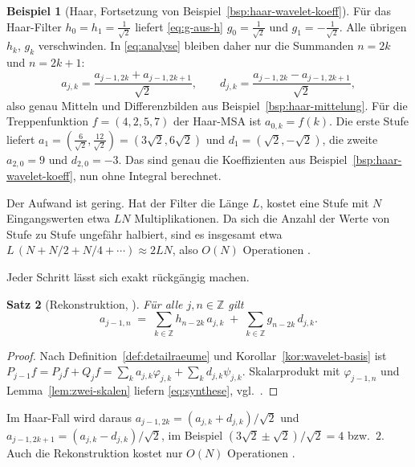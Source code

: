 \documentclass[a4paper,11pt,bibliography=totoc,listof=totoc,headinclude=true,cleardoublepage=empty,oneside]{scrbook}
\theoremstyle{plain}
\newtheorem{Satz}{Satz}[chapter]
\theoremstyle{definition}
\newtheorem{Beispiel}[Satz]{Beispiel}
\newcommand{\Z}{\mathbb{Z}}
\begin{document}
\begin{Beispiel}[Haar, Fortsetzung von Beispiel~\ref{bsp:haar-wavelet-koeff}]
\label{bsp:mallat-haar}
Für das Haar-Filter $h_0=h_1=\tfrac{1}{\sqrt2}$ liefert \eqref{eq:g-aus-h}
$g_0=\tfrac{1}{\sqrt2}$ und $g_1=-\tfrac{1}{\sqrt2}$. Alle übrigen $h_k$, $g_k$
verschwinden. In \eqref{eq:analyse} bleiben daher nur die Summanden
$n=2k$ und $n=2k+1$:
\[
  a_{j,k} = \frac{a_{j-1,2k} + a_{j-1,2k+1}}{\sqrt2},
  \qquad
  d_{j,k} = \frac{a_{j-1,2k} - a_{j-1,2k+1}}{\sqrt2},
\]
also genau Mitteln und Differenzbilden aus Beispiel~\ref{bsp:haar-mittelung}.
Für die Treppenfunktion $f=(4,2,5,7)$ der Haar-MSA ist $a_{0,k} = f(k)$. Die
erste Stufe liefert
$a_1 = (\tfrac{6}{\sqrt2},\tfrac{12}{\sqrt2}) = (3\sqrt2,6\sqrt2)$ und
$d_1 = (\sqrt2,-\sqrt2)$, die zweite $a_{2,0} = 9$ und $d_{2,0} = -3$. Das sind
genau die Koeffizienten aus Beispiel~\ref{bsp:haar-wavelet-koeff}, nun ohne
Integral berechnet.
\end{Beispiel}

Der Aufwand ist gering. Hat der Filter die Länge $L$, kostet eine Stufe mit $N$
Eingangswerten etwa $LN$ Multiplikationen. Da sich die Anzahl der Werte von
Stufe zu Stufe ungefähr halbiert, sind es insgesamt etwa
$L\,(N + N/2 + N/4 + \cdots) \approx 2LN$, also $O(N)$ Operationen
\cite[Kap.~5.4]{blatter}. %

Jeder Schritt lässt sich exakt rückgängig machen.

\begin{Satz}[Rekonstruktion, {\cite[Kap.~5.4]{blatter}}] %
\label{satz:rekonstruktion}
Für alle $j,n\in\Z$ gilt
\begin{equation}
\label{eq:synthese}
  a_{j-1,n} \;=\; \sum_{k\in\Z} h_{n-2k}\,a_{j,k} \;+\; \sum_{k\in\Z} g_{n-2k}\,d_{j,k} .
\end{equation}
\end{Satz}

\begin{proof}
Nach Definition~\ref{def:detailraeume} und Korollar~\ref{kor:wavelet-basis} ist
$P_{j-1}f = P_jf + Q_jf = \sum_k a_{j,k}\varphi_{j,k} + \sum_k d_{j,k}\psi_{j,k}$.
Skalarprodukt mit $\varphi_{j-1,n}$ und Lemma~\ref{lem:zwei-skalen} liefern
\eqref{eq:synthese}, vgl.\ \cite[Kap.~5.4]{blatter}. %
\end{proof}

Im Haar-Fall wird daraus
$a_{j-1,2k} = (a_{j,k}+d_{j,k})/\sqrt2$ und
$a_{j-1,2k+1} = (a_{j,k}-d_{j,k})/\sqrt2$, im Beispiel
$(3\sqrt2\pm\sqrt2)/\sqrt2 = 4$ bzw.\ $2$. Auch die Rekonstruktion kostet nur
$O(N)$ Operationen \cite[Kap.~5.4]{blatter}. %
\end{document}
